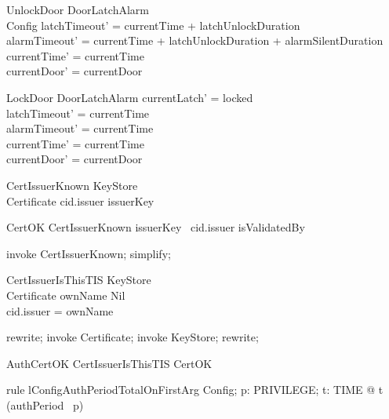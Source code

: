 \begin{schema}{UnlockDoor}
  \Delta DoorLatchAlarm\\
  Config
\where
  latchTimeout' = currentTime + latchUnlockDuration\\
  alarmTimeout' = currentTime + latchUnlockDuration + alarmSilentDuration\\
  currentTime' = currentTime\\
  currentDoor' = currentDoor
\end{schema}

\begin{schema}{LockDoor}
  \Delta DoorLatchAlarm
\where
  currentLatch' = locked\\
  latchTimeout' = currentTime\\
  alarmTimeout' = currentTime\\
  currentTime' = currentTime\\
  currentDoor' = currentDoor
\end{schema}

\begin{schema}{CertIssuerKnown}
  KeyStore\\
  Certificate
\where
  cid.issuer \in  \dom  issuerKey
\end{schema}

\begin{schema}{CertOK}
  CertIssuerKnown
\where
  issuerKey~ cid.issuer \in  isValidatedBy
\end{schema}

\begin{zproof}
invoke CertIssuerKnown;
simplify;
\end{zproof}

\begin{schema}{CertIssuerIsThisTIS}
  KeyStore\\
  Certificate
\where
  ownName \neq  Nil\\
  cid.issuer = \The ownName
\end{schema}

\begin{zproof}
rewrite;
invoke Certificate;
invoke KeyStore;
rewrite;
\end{zproof}

\begin{zed}
AuthCertOK  CertIssuerIsThisTIS \land  CertOK
\end{zed}

\begin{theorem}{rule lConfigAuthPeriodTotalOnFirstArg}
\forall  Config; p: PRIVILEGE; t: TIME @ t \in  \dom~  (authPeriod~ p)
\end{theorem}

